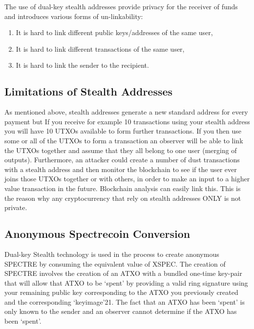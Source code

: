 The use of dual-key stealth addresses provide privacy for the receiver of
funds and introduces various forms of un-linkability: 



\begin{enumerate}
	\item It is hard to	link different public keys/addresses of the same user,
	\item It is hard to	link different transactions of the same user,
	\item It is hard to link the sender to the recipient.
\end{enumerate}



\subsection{Limitations of Stealth Addresses}
As mentioned above, stealth addresses generate a new standard address for
every payment but If you receive for example 10 transactions using your
stealth address you will have 10 UTXOs available to form further
transactions. If you then use some or all of the UTXOs to form a transaction
an observer will be able to link the UTXOs together and assume that they all
belong to one user (merging of outputs). Furthermore, an attacker could
create a number of dust transactions with a stealth address and then monitor
the blockchain to see if the user ever joins those UTXOs together or with
others, in order to make an input to a higher value transaction in the future.
Blockchain analysis can easily link this. This is the reason why any
cryptocurrency that rely on stealth addresses ONLY is not private.



\subsection{Anonymous Spectrecoin Conversion}
Dual-key Stealth technology is used in the process to create anonymous SPECTRE
by consuming the equivalent value of XSPEC. The creation of SPECTRE involves
the creation of an ATXO with a bundled one-time key-pair that will allow that
ATXO to be ‘spent’ by providing a valid ring signature using your remaining
public key corresponding to the ATXO you previously created and the
corresponding ‘keyimage’21. The fact that an ATXO has been ‘spent’ is only
known to the sender and an observer cannot determine if the ATXO has been
‘spent’.



